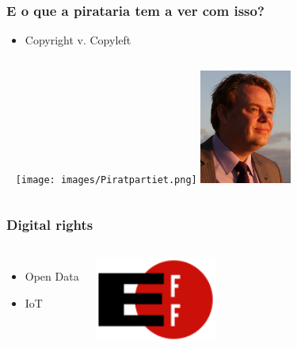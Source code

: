\documentclass{beamer}
\begin{document}
\begin{frame}
  \frametitle{E o que a pirataria tem a ver com isso?}
  \begin{itemize}
  \item Copyright v. Copyleft
  \end{itemize}
  \vfill
  \begin{center}
    \begin{columns}
      \column{2cm}
      {\ }
      \column{5cm}
      \texttt{[image: images/Piratpartiet.png]}
      \column{6cm}
      \includegraphics[width=3cm]{images/Rick_Falkvinge.jpg}
    \end{columns}
  \end{center}
\end{frame}

\begin{frame}
  \frametitle{Digital rights}
  \begin{columns}
    \column{4cm}
    \begin{itemize}
    \item Open Data
    \item IoT
    \end{itemize}
    \column{4cm}
    \includegraphics[width=4cm]{images/EFF_Logo.png}
  \end{columns}
\end{frame}

\end{document}
